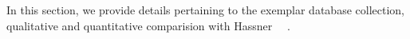 In this section, we provide details pertaining to the exemplar database collection, 
qualitative and quantitative comparision with Hassner ~\etal~\cite{DBLP:journals/corr/HassnerHPE14}.
